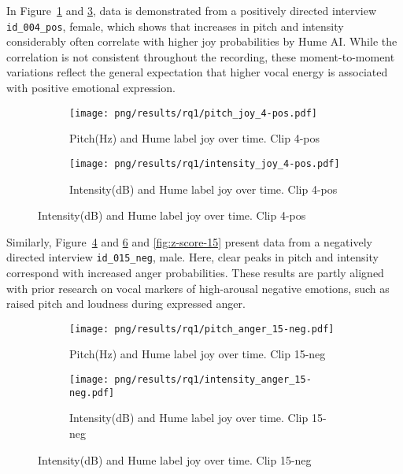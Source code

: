 In Figure~\ref{fig:pitch-4-pos} and \ref{fig:intensity-4-pos}, data is demonstrated from a positively directed interview \texttt{id\_004\_pos}, female, which shows that increases in pitch and intensity considerably often correlate with higher joy probabilities by Hume AI. While the correlation is not consistent throughout the recording, these moment-to-moment variations reflect the general expectation that higher vocal energy is associated with positive emotional expression. 

\begin{figure}[H]
    \centering
    \begin{subfigure}[b]{0.47\textwidth}
        \texttt{[image: png/results/rq1/pitch\_joy\_4-pos.pdf]}
        \caption{Pitch(Hz) and Hume label joy over time. Clip 4-pos}
        \label{fig:pitch-4-pos}
    \end{subfigure}
    \hspace{0.04\textwidth}
    \begin{subfigure}[b]{0.47\textwidth}
        \texttt{[image: png/results/rq1/intensity\_joy\_4-pos.pdf]}
        \caption{Intensity(dB) and Hume label joy over time. Clip 4-pos}
        \label{fig:intensity-4-pos}
    \end{subfigure}
\end{figure}

Similarly, Figure~\ref{fig:pitch-15-neg} and \ref{fig:intensity-15-neg} and \ref{fig:z-score-15} present data from a negatively directed interview \texttt{id\_015\_neg}, male. Here, clear peaks in pitch and intensity correspond with increased anger probabilities. These results are partly aligned with prior research on vocal markers of high-arousal negative emotions, such as raised pitch and loudness during expressed anger. 

\begin{figure}[H]
    \centering
    \begin{subfigure}[b]{0.47\textwidth}
        \texttt{[image: png/results/rq1/pitch\_anger\_15-neg.pdf]}
        \caption{Pitch(Hz) and Hume label joy over time. Clip 15-neg}
        \label{fig:pitch-15-neg}
    \end{subfigure}
    \hspace{0.04\textwidth}
    \begin{subfigure}[b]{0.47\textwidth}
        \texttt{[image: png/results/rq1/intensity\_anger\_15-neg.pdf]}
        \caption{Intensity(dB) and Hume label joy over time. Clip 15-neg}
        \label{fig:intensity-15-neg}
    \end{subfigure}
\end{figure}

